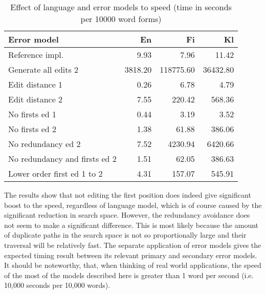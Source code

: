 \documentclass[11pt]{article}
\begin{document}
\begin{table}[h]
\begin{center}
\begin{scriptsize}
\begin{tabular}{|l|rrr|}
\hline
\bf Error model & \bf En & \bf Fi & \bf Kl \\ 
\hline
Reference impl. &
9.93&7.96&11.42
\\
Generate all edits 2 & 
3818.20&118775.60&36432.80
\\
\hline
Edit distance 1 &
0.26&6.78&4.79
\\
Edit distance 2 &
7.55&220.42&568.36
\\
No firsts ed 1 & 
0.44&3.19&3.52
\\
No firsts ed 2 &
1.38&61.88&386.06
\\
No redundancy ed 2 &
7.52&4230.94&6420.66
\\
No redundancy and firsts ed 2 &
1.51&62.05&386.63
\\
Lower order first ed 1 to 2 &
4.31&157.07&545.91
\\
\hline
\end{tabular}
\end{scriptsize}
\end{center}
\caption{\label{table:error-model-vs-language-speed} Effect of language and 
error models to speed (time in seconds per 10000 word forms)}
\end{table}

The results show that not editing the first position does indeed give
significant boost to the speed, regardless of language model, which is of course
caused by the significant reduction in search space. However, the
redundancy avoidance does not seem to make a significant difference. This is most
likely because the amount of duplicate paths in the search space is not so
proportionally large and their traversal will be relatively fast. The separate
application of error models gives the expected timing result between its
relevant primary and secondary error models. It should be noteworthy, that, when
thinking of real world applications, the speed of the most of the models
described here is greater than 1 word per second (i.e. 10,000 seconds per 10,000
words).
\end{document}

